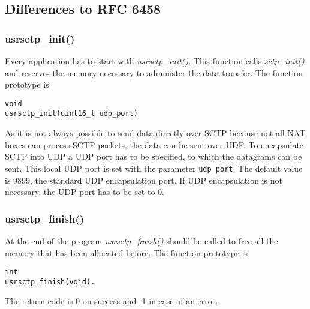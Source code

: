 \documentclass[a4paper]{article}
\begin{document}
\subsection{Differences to RFC 6458}
\subsubsection{usrsctp\_init()}
Every application has to start with \textit{usrsctp\_init()}. This function calls \textit{sctp\_init()} and reserves
the memory necessary to administer the data transfer.
The function prototype is 
\begin{verbatim}
void
usrsctp_init(uint16_t udp_port)
\end{verbatim}
As it is not always possible to send data directly over SCTP because not all NAT boxes can
process SCTP packets, the data can be sent over UDP. To encapsulate SCTP into UDP
a UDP port has to be specified, to which the datagrams can be sent. This local UDP port  is set 
with the parameter \texttt{udp\_port}. The default value is 9899, the standard UDP encapsulation port.
If UDP encapsulation is not necessary, the UDP port has to be set to 0.

\subsubsection{usrsctp\_finish()}
At the end of the program \textit{usrsctp\_finish()} should be called to free all the memory that has been
allocated before.
The function prototype is 
\begin{verbatim}
int
usrsctp_finish(void).
\end{verbatim}
The return code is 0 on success and -1 in case of an error.
\end{document}
